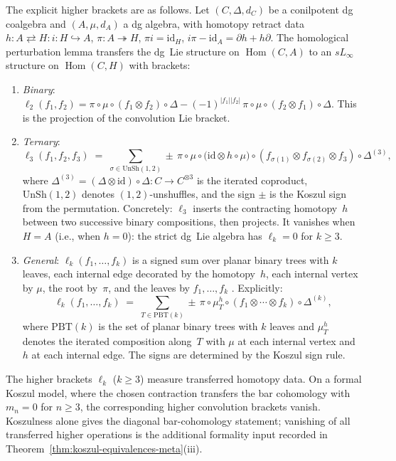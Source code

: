 \begin{remark}
\label{rem:explicit-higher-brackets}
The explicit higher brackets are as follows. Let
$(C, \Delta, d_C)$ be a conilpotent dg coalgebra and $(A, \mu, d_A)$
a dg algebra, with homotopy retract data
$h\colon A \rightleftarrows H\colon i\colon H \hookrightarrow A$,
$\pi\colon A \twoheadrightarrow H$, $\pi i = \mathrm{id}_H$,
$i\pi - \mathrm{id}_A = \partial h + h \partial$.
The homological perturbation lemma
\cite[Theorem~10.3.1]{LV12}
transfers the dg~Lie structure on
$\operatorname{Hom}(C, A)$ to an $sL_\infty$ structure on
$\operatorname{Hom}(C, H)$ with brackets:
\begin{enumerate}[label=\textup{(\roman*)}]
\item \emph{Binary}:
 $\ell_2(f_1, f_2)
 = \pi \circ \mu \circ (f_1 \otimes f_2) \circ \Delta
 - (-1)^{|f_1||f_2|}\,
 \pi \circ \mu \circ (f_2 \otimes f_1) \circ \Delta$.
 This is the projection of the convolution Lie bracket.
\item \emph{Ternary}:
 \begin{equation}\label{eq:ell3-convolution-explicit}
 \ell_3(f_1, f_2, f_3)
 \;=\;
 \sum_{\sigma \in \mathrm{UnSh}(1,2)}
 \pm\,
 \pi \circ \mu \circ
 \bigl(
 \mathrm{id} \otimes h \circ \mu
 \bigr) \circ
 (f_{\sigma(1)} \otimes f_{\sigma(2)} \otimes f_3)
 \circ \Delta^{(3)},
 \end{equation}
 where $\Delta^{(3)} = (\Delta \otimes \mathrm{id})
 \circ \Delta\colon C \to C^{\otimes 3}$ is the iterated
 coproduct, $\mathrm{UnSh}(1,2)$ denotes $(1,2)$-unshuffles,
 and the sign $\pm$ is the Koszul sign from the permutation.
 Concretely: $\ell_3$ inserts the contracting homotopy~$h$
 between two successive binary compositions, then projects.
 It vanishes when $H = A$ (i.e., when $h = 0$): the strict
 dg~Lie algebra has $\ell_k = 0$ for $k \geq 3$.
\item \emph{General}:
 $\ell_k(f_1, \ldots, f_k)$ is a signed sum over planar
 binary trees with $k$ leaves, each internal edge decorated
 by the homotopy~$h$, each internal vertex by $\mu$, the
 root by~$\pi$, and the leaves by
 $f_1, \ldots, f_k$ \cite[Theorem~10.3.8]{LV12}.
 Explicitly:
 \[
 \ell_k(f_1, \ldots, f_k)
 \;=\;
 \sum_{T \in \mathrm{PBT}(k)}
 \pm\,
 \pi \circ \mu_T^h \circ
 (f_1 \otimes \cdots \otimes f_k) \circ
 \Delta^{(k)},
 \]
 where $\mathrm{PBT}(k)$ is the set of planar binary trees
 with $k$ leaves and $\mu_T^h$ denotes the iterated
 composition along~$T$ with $\mu$ at each internal vertex
 and~$h$ at each internal edge. The signs are determined by
 the Koszul sign rule.
\end{enumerate}
The higher brackets
$\ell_k$ ($k \geq 3$) measure transferred homotopy data.
On a formal Koszul model, where the chosen contraction transfers
the bar cohomology with $m_n=0$ for $n \geq 3$, the corresponding
higher convolution brackets vanish. Koszulness alone gives the
diagonal bar-cohomology statement; vanishing of all transferred
higher operations is the additional formality input recorded in
Theorem~\ref{thm:koszul-equivalences-meta}(iii).
\end{remark}

